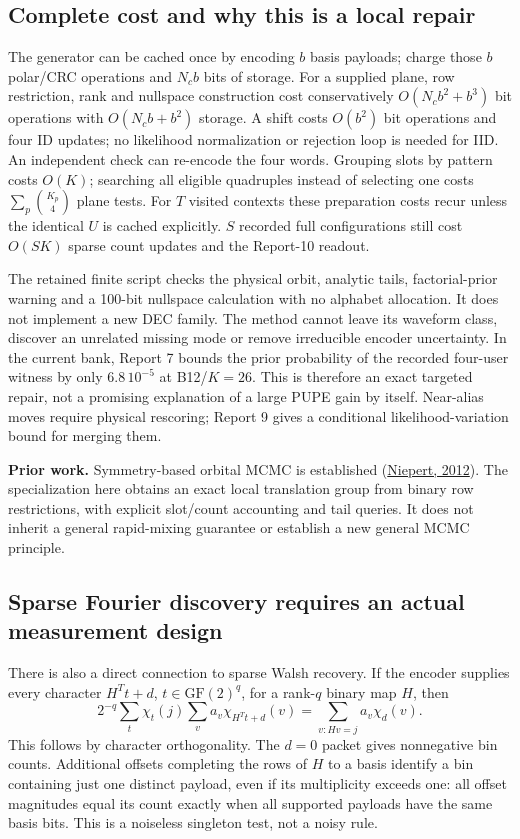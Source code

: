 \documentclass[10pt,a4paper]{article}
\newcommand{\GF}{\mathrm{GF}}
\begin{document}
\subsection{Complete cost and why this is a local repair}
The generator can be cached once by encoding $b$ basis payloads; charge those $b$ polar/CRC operations
and $N_cb$ bits of storage. For a supplied plane, row restriction, rank and nullspace construction cost
conservatively $O(N_cb^2+b^3)$ bit operations with $O(N_cb+b^2)$ storage. A shift costs $O(b^2)$ bit
operations and four ID updates; no likelihood normalization or rejection loop is needed for IID.
An independent check can re-encode the four words. Grouping slots by pattern costs $O(K)$; searching
all eligible quadruples instead of selecting one costs $\sum_p\binom{K_p}{4}$ plane tests.
For $T$ visited contexts these preparation costs recur unless the identical $U$ is cached explicitly.
$S$ recorded full configurations still cost $O(SK)$ sparse count updates and the Report-10 readout.

The retained finite script checks the physical orbit, analytic tails, factorial-prior warning and a
100-bit nullspace calculation with no alphabet allocation. It does not implement a new DEC family.
The method cannot leave its waveform class, discover an unrelated missing mode or remove irreducible
encoder uncertainty. In the current bank, Report 7 bounds the prior probability of the recorded
four-user witness by only $6.8\,10^{-5}$ at B12/$K=26$. This is therefore an exact targeted repair,
not a promising explanation of a large PUPE gain by itself. Near-alias moves require physical rescoring;
Report 9 gives a conditional likelihood-variation bound for merging them.

\textbf{Prior work.} Symmetry-based orbital MCMC is established
(\href{https://arxiv.org/abs/1206.5396}{Niepert, 2012}). The specialization here obtains an exact
local translation group from binary row restrictions, with explicit slot/count accounting and tail queries.
It does not inherit a general rapid-mixing guarantee or establish a new general MCMC principle.

\subsection{Sparse Fourier discovery requires an actual measurement design}
There is also a direct connection to sparse Walsh recovery. If the encoder supplies every character
$H^Tt+d$, $t\in\GF(2)^q$, for a rank-$q$ binary map $H$, then
\begin{equation}
 2^{-q}\sum_t\chi_t(j)\sum_v a_v\chi_{H^Tt+d}(v)
 =\sum_{v:Hv=j}a_v\chi_d(v).
 \label{eq:character-bin}
\end{equation}
This follows by character orthogonality. The $d=0$ packet gives nonnegative bin counts.
Additional offsets completing the rows of $H$ to a basis identify a bin containing just one distinct
payload, even if its multiplicity exceeds one: all offset magnitudes equal its count exactly when
all supported payloads have the same basis bits. This is a noiseless singleton test, not a noisy rule.
\end{document}
